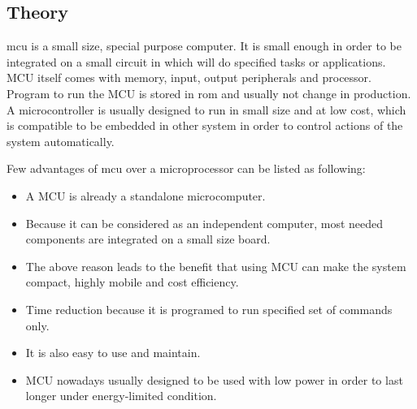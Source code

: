 % 
  \subsection{Theory}
  \gls{mcu} is a small size, special purpose computer. It is small enough in order to be integrated on a small circuit in which will do specified tasks or applications. MCU itself comes with memory, input, output peripherals and processor. Program to run the MCU is stored in \gls{rom} and usually not change in production. A microcontroller is usually designed to run in small size and at low cost, which is compatible to be embedded in other system in order to control actions of the system automatically.

  Few advantages of \gls{mcu} over a microprocessor can be listed as following:
  \begin{itemize}
    \item A MCU is already a standalone microcomputer.
    \item Because it can be considered as an independent computer, most needed components are integrated on a small size board.
    \item The above reason leads to the benefit that using MCU can make the system compact, highly mobile and cost efficiency.
    \item Time reduction because it is programed to run specified set of commands only.
    \item It is also easy to use and maintain.
    \item MCU nowadays usually designed to be used with low power in order to last longer under energy-limited condition.
  \end{itemize}

